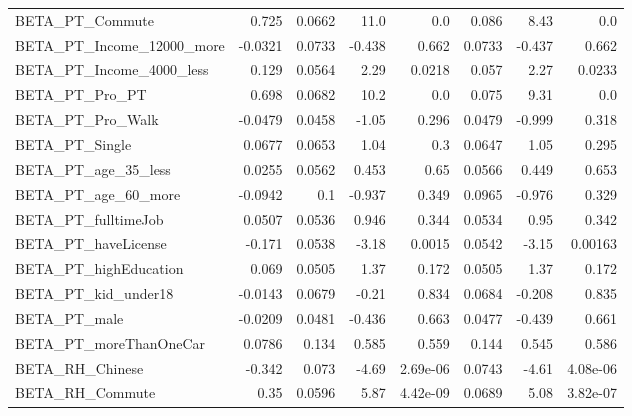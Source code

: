 \begin{tabular}{lrrrrrrr}
BETA\_PT\_Commute              &    0.725 &   0.0662 &    11.0 &      0.0 &         0.086 &         8.43 &           0.0 \\
BETA\_PT\_Income\_12000\_more    &  -0.0321 &   0.0733 &  -0.438 &    0.662 &        0.0733 &       -0.437 &         0.662 \\
BETA\_PT\_Income\_4000\_less     &    0.129 &   0.0564 &    2.29 &   0.0218 &         0.057 &         2.27 &        0.0233 \\
BETA\_PT\_Pro\_PT               &    0.698 &   0.0682 &    10.2 &      0.0 &         0.075 &         9.31 &           0.0 \\
BETA\_PT\_Pro\_Walk             &  -0.0479 &   0.0458 &   -1.05 &    0.296 &        0.0479 &       -0.999 &         0.318 \\
BETA\_PT\_Single               &   0.0677 &   0.0653 &    1.04 &      0.3 &        0.0647 &         1.05 &         0.295 \\
BETA\_PT\_age\_35\_less          &   0.0255 &   0.0562 &   0.453 &     0.65 &        0.0566 &        0.449 &         0.653 \\
BETA\_PT\_age\_60\_more          &  -0.0942 &      0.1 &  -0.937 &    0.349 &        0.0965 &       -0.976 &         0.329 \\
BETA\_PT\_fulltimeJob          &   0.0507 &   0.0536 &   0.946 &    0.344 &        0.0534 &         0.95 &         0.342 \\
BETA\_PT\_haveLicense          &   -0.171 &   0.0538 &   -3.18 &   0.0015 &        0.0542 &        -3.15 &       0.00163 \\
BETA\_PT\_highEducation        &    0.069 &   0.0505 &    1.37 &    0.172 &        0.0505 &         1.37 &         0.172 \\
BETA\_PT\_kid\_under18          &  -0.0143 &   0.0679 &   -0.21 &    0.834 &        0.0684 &       -0.208 &         0.835 \\
BETA\_PT\_male                 &  -0.0209 &   0.0481 &  -0.436 &    0.663 &        0.0477 &       -0.439 &         0.661 \\
BETA\_PT\_moreThanOneCar       &   0.0786 &    0.134 &   0.585 &    0.559 &         0.144 &        0.545 &         0.586 \\
BETA\_RH\_Chinese              &   -0.342 &    0.073 &   -4.69 & 2.69e-06 &        0.0743 &        -4.61 &      4.08e-06 \\
BETA\_RH\_Commute              &     0.35 &   0.0596 &    5.87 & 4.42e-09 &        0.0689 &         5.08 &      3.82e-07 \\

\end{tabular}
